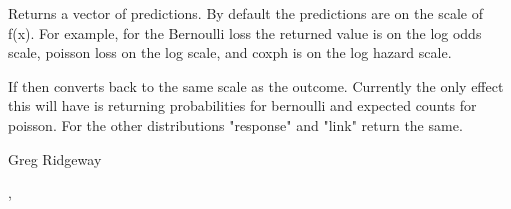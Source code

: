 \begin{Value}
Returns a vector of predictions. By default the predictions are on the scale of f(x). For example, for the Bernoulli loss the returned value is on the log odds scale, poisson loss on the log scale, and coxph is on the log hazard scale.

If  then  converts back to the same scale as the outcome. Currently the only effect this will have is returning probabilities for bernoulli and expected counts for poisson. For the other distributions "response" and "link" return the same.
\end{Value}
\begin{Author}\relax
Greg Ridgeway 
\end{Author}
\begin{SeeAlso}\relax
{}, 
\end{SeeAlso}

